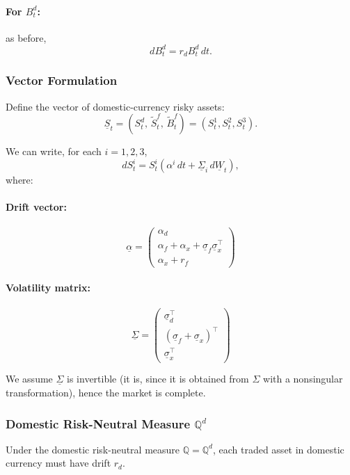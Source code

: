 \documentclass[12pt,a4paper]{article}
\theoremstyle{definition}
\begin{document}
\paragraph{For $B_t^d$:} as before,
\[
dB_t^d = r_d B_t^d\, dt.
\]

\subsubsection{Vector Formulation}

Define the vector of domestic-currency risky assets:
\[
\underline{S}_t = (S_t^d,\, \widetilde{S}_t^f,\, \widetilde{B}_t^f) = (S_t^1, S_t^2, S_t^3).
\]

We can write, for each $i = 1, 2, 3$,
\[
dS_t^i = S_t^i(\alpha^i\, dt + \underline{\Sigma}_i\, d\underline{W}_t),
\]
where:

\paragraph{Drift vector:}

\[
\underline{\alpha} = \begin{pmatrix}
\alpha_d \\
\alpha_f + \alpha_x + \underline{\sigma}_f \underline{\sigma}_x^\top \\
\alpha_x + r_f
\end{pmatrix}
\]

\paragraph{Volatility matrix:}

\[
\underline{\Sigma} = \begin{pmatrix}
\underline{\sigma}_d^\top \\
(\underline{\sigma}_f + \underline{\sigma}_x)^\top \\
\underline{\sigma}_x^\top
\end{pmatrix}
\]

We assume $\underline{\Sigma}$ is invertible (it is, since it is obtained from $\Sigma$ with a nonsingular transformation), hence the market is complete.

\subsubsection{Domestic Risk-Neutral Measure $\mathbb{Q}^d$}

Under the domestic risk-neutral measure $\mathbb{Q} = \mathbb{Q}^d$, each traded asset in domestic currency must have drift $r_d$.
\end{document}
